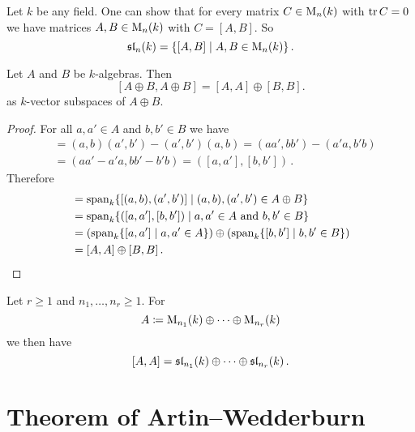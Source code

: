 \begin{rem}
  Let $k$ be any field.
  One can show that for every matrix $C \in \operatorname{M}_n(k)$ with $\operatorname{tr} C = 0$ we have matrices $A, B \in \operatorname{M}_n(k)$ with $C = [A,B]$.
  So
  \[
      \operatorname{\mathfrak{sl}}_n(k)
    = \{
        [A,B]
      \mid
        A, B \in \operatorname{M}_n(k)
      \} \,.
  \]
\end{rem}


\begin{lem}
  Let $A$ and $B$ be $k$-algebras. Then
  \[
      [A \oplus B, A \oplus B]
    = [A,A] \oplus [B,B].
  \]
  as $k$-vector subspaces of $A \oplus B$.
\end{lem}
\begin{proof}
  For all $a, a' \in A$ and $b, b' \in B$ we have
  \begin{align*}
        [(a,b),(a',b')]
    &=  (a,b)(a',b') - (a',b')(a,b)
     =  (aa',bb') - (a'a, b'b) \\
    &=  (aa'-a'a, bb' - b'b)
     =  ([a,a'], [b,b']) \,.
  \end{align*}
  Therefore
  \begin{align*}
        [A \oplus B, A \oplus B]
    &=  \vspan_k  \{
                    [(a,b), (a',b')]
                  \mid
                    (a,b), (a',b') \in A \oplus B
                  \} \\
    &= \vspan_k \{
                  ([a,a'], [b,b'])
                \mid
                  a, a' \in A
                  \text{ and }
                  b, b' \in B
                \} \\
    &=  \left(
          \vspan_k \{ [a,a'] \mid a, a' \in A \}
        \right)
        \oplus
        \left(
          \vspan_k \{ [b,b'] \mid b, b' \in B \}
        \right) \\
    &= [A,A] \oplus [B,B] \,.
    \qedhere
  \end{align*}
\end{proof}


\begin{cor}\label{cor: commutator product of matrix algebras}
  Let $r \geq 1$ and $n_1, \dots, n_r \geq 1$. For
  \[
    A \coloneqq \operatorname{M}_{n_1}(k) \oplus \dotsb \oplus \operatorname{M}_{n_r}(k)
  \]
  we then have
  \[
      [A,A]
    = \operatorname{\mathfrak{sl}}_{n_1}(k) \oplus \dotsb \oplus \operatorname{\mathfrak{sl}}_{n_r}(k) \,.
  \]
\end{cor}





\section{Theorem of Artin--Wedderburn}


